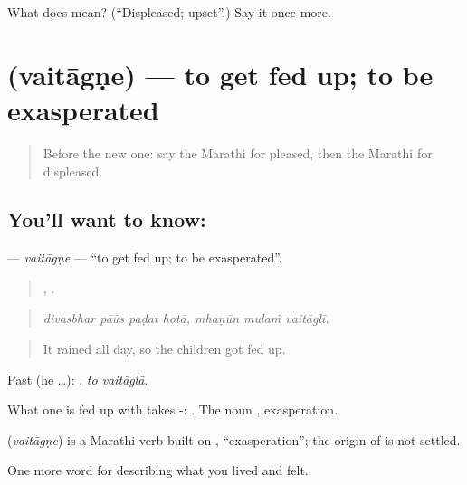 \begin{tcolorbox}[breakable,colback=teal!4,colframe=teal!35!black,title={Before you move on}]
What does  mean? (\textquotedblleft{}Displeased; upset\textquotedblright{}.) Say it once more.
\end{tcolorbox}
\section[\texorpdfstring{\mr{वैतागणे} (vaitāgṇe)}{वैतागणे (vaitāgṇe)}]{ (vaitāgṇe) — to get fed up; to be exasperated}

\label{lesson:MR-C451-vaitagne}



\begin{quote}
Before the new one: say the Marathi for pleased, then the Marathi for displeased.
\end{quote}

\subsection*{You'll want to know: }
\textbf{} — \emph{vaitāgṇe} — \textquotedblleft{}to get fed up; to be exasperated\textquotedblright{}.

\begin{quote}
   ,   .
\end{quote}

\begin{quote}
\emph{divasbhar pāūs paḍat hotā, mhaṇūn mulaṁ vaitāglī.}
\end{quote}

\begin{quote}
It rained all day, so the children got fed up.
\end{quote}

Past (he …):  , \emph{to vaitāglā}.

What one is fed up with takes -:  . The noun , exasperation.

\begin{cousinweb}
\textbf{} (\emph{vaitāgṇe}) is a Marathi verb built on , \textquotedblleft{}exasperation\textquotedblright{}; the origin of  is not settled.
\end{cousinweb}

\begin{grammarlens}[title={What you've built}]
One more word for describing what you lived and felt.
\end{grammarlens}


